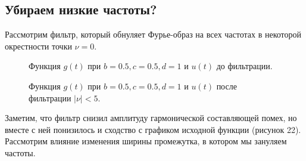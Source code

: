 \documentclass[a5paper, 10pt]{article}
\theoremstyle{definition}
\theoremstyle{plain}
\theoremstyle{remark}
\begin{document}
\newpage
\subsection{Убираем низкие частоты?}
Рассмотрим фильтр, который обнуляет Фурье-образ на всех частотах в некоторой окрестности точки $\nu = 0$.

\begin{figure}[h!]
\caption{Функция $g(t)$ при $b = 0.5, c = 0.5, d = 1$  и $u(t)$ до фильтрации.}
\end{figure}

\begin{figure}[h!]
\caption{Функция $g(t)$ при $b = 0.5, c = 0.5, d = 1$  и $u(t)$ после фильтрации $|\nu | < 5$.}
\end{figure}

Заметим, что фильтр снизил амплитуду гармонической составляющей помех, но вместе с ней понизилось и сходство с графиком исходной функции (рисунок 22).\\ 

 Рассмотрим влияние изменения ширины промежутка, в котором мы зануляем частоты.
\end{document}
